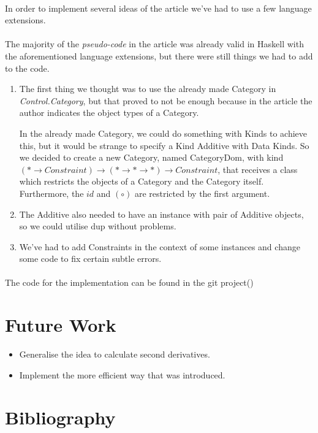 \documentclass[11pt,a4]{article}
\newcommand{\Conid}[1]{\mathit{#1}}
\newcommand{\Varid}[1]{\mathit{#1}}
\theoremstyle{definition}
\theoremstyle{Definition}
\theoremstyle{Definition}
\begin{document}
	\paragraph{} In order to implement several ideas of the article we've had to use a few language extensions.
	\paragraph{} The majority of the \textit{pseudo-code} in the article was already valid in Haskell with the aforementioned language extensions, but there were still things we had to add to the code.
	\begin{enumerate}
		\item 
		The first thing we thought was to use the already made Category in \textit{Control.Category}, but that proved to not be enough because in the article the author indicates the object types of a Category.
        
		In the already made Category, we could do something with Kinds to achieve this, but it would be strange to specify a Kind Additive with Data Kinds. So we decided to create a new Category, named CategoryDom, with kind \ensuremath{(\mathbin{*}\rightarrow \Conid{Constraint})\rightarrow (\mathbin{*}\rightarrow \mathbin{*}\rightarrow \mathbin{*})\rightarrow \Conid{Constraint}}, that receives a class which restricts the objects of a Category and the Category itself. Furthermore, the \ensuremath{\Varid{id}} and \ensuremath{(\mathbin{\circ})} are restricted by the first argument.
		\item
		The Additive also needed to have an instance with pair of Additive objects, so we could utilise dup without problems.
		\item 
		We've had to add Constraints in the context of some instances and change some code to fix certain subtle errors.
	\end{enumerate}
	\paragraph{} The code for the implementation can be found in the git project(\cite{project})
	
	\section{Future Work}
	\begin{itemize}
		\item 
		Generalise the idea to calculate second derivatives.
		\item 
		Implement the more efficient way that was introduced.
	\end{itemize}
	
	
	
	\newpage

\section{Bibliography}


    
\end{document}

